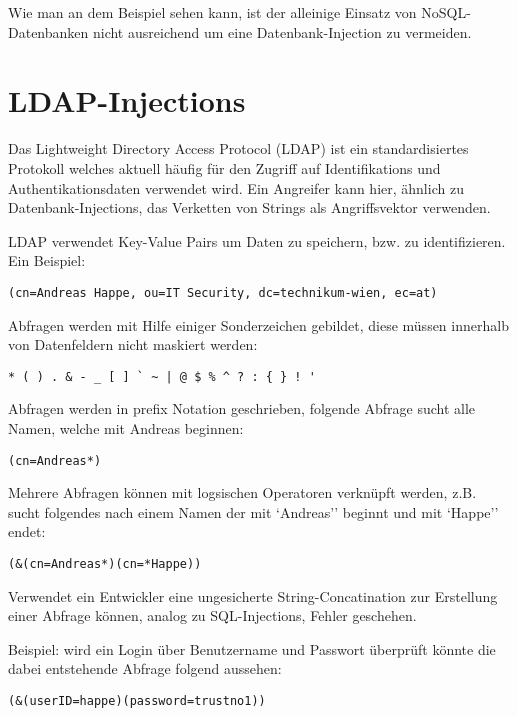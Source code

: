 Wie man an dem Beispiel sehen kann, ist der alleinige Einsatz von NoSQL-Datenbanken nicht ausreichend um eine Datenbank-Injection zu vermeiden.

\section{LDAP-Injections}

Das Lightweight Directory Access Protocol (LDAP) ist ein standardisiertes Protokoll welches aktuell häufig für den Zugriff auf Identifikations und Authentikationsdaten verwendet wird. Ein Angreifer kann hier, ähnlich zu Datenbank-Injections, das Verketten von Strings als Angriffsvektor verwenden.

LDAP verwendet Key-Value Pairs um Daten zu speichern, bzw. zu identifizieren. Ein Beispiel:

\begin{verbatim}
(cn=Andreas Happe, ou=IT Security, dc=technikum-wien, ec=at)
\end{verbatim}

Abfragen werden mit Hilfe einiger Sonderzeichen gebildet, diese müssen innerhalb von Datenfeldern nicht maskiert werden:

\begin{verbatim}
* ( ) . & - _ [ ] ` ~ | @ $ % ^ ? : { } ! '
\end{verbatim}

Abfragen werden in prefix Notation geschrieben, folgende Abfrage sucht alle Namen, welche mit Andreas beginnen:

\begin{verbatim}
(cn=Andreas*)
\end{verbatim}

Mehrere Abfragen können mit logsischen Operatoren verknüpft werden, z.B. sucht folgendes nach einem Namen der mit `Andreas'' beginnt und mit `Happe'' endet:

\begin{verbatim}
(&(cn=Andreas*)(cn=*Happe))
\end{verbatim}

Verwendet ein Entwickler eine ungesicherte String-Concatination zur Erstellung einer Abfrage können, analog zu SQL-Injections, Fehler geschehen.

Beispiel: wird ein Login über Benutzername und Passwort überprüft könnte die dabei entstehende Abfrage folgend aussehen:

\begin{verbatim}
(&(userID=happe)(password=trustno1))
\end{verbatim}

